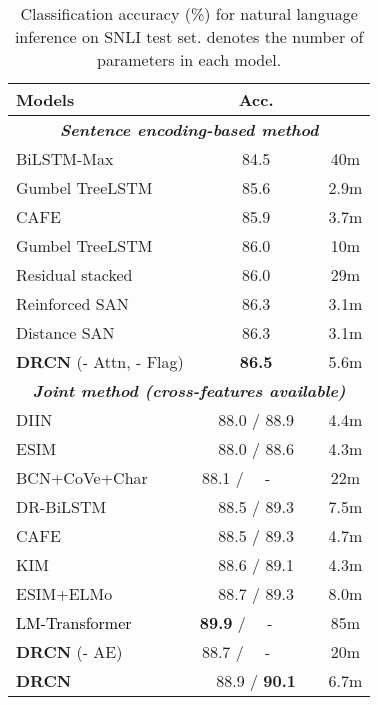 \documentclass[letterpaper]{article} \usepackage{aaai19}  \usepackage{times}  \usepackage{helvet}  \usepackage{courier}  \usepackage{url}  \usepackage{graphicx}  \frenchspacing  \setlength{\pdfpagewidth}{8.5in}  \setlength{\pdfpageheight}{11in}
\newcommand\shh[1]{\textcolor{black}{#1}}
\begin{document}
\begin{table}[t]
\centering
\resizebox{\linewidth}{!}
{
\begin{tabular}{lcc}\hline
   	\textbf{Models} & \textbf{Acc.} & \textbf{}  \\
	\hline
    \multicolumn{3}{c}{\textit{\textbf{Sentence encoding-based method}}} \\
	\hline
	BiLSTM-Max \cite{conneau2017supervised} & 84.5 & 40m   \\
Gumbel TreeLSTM \cite{choi2017learning} & 85.6 & 2.9m   \\
    CAFE \cite{tay2017compare} & 85.9 & 3.7m  \\
	Gumbel TreeLSTM \cite{choi2017learning} & 86.0 & 10m   \\
	Residual stacked \cite{nie2017shortcut} & 86.0 & 29m  \\ 
	Reinforced SAN \cite{shen2018reinforced} & 86.3 & 3.1m \\ 
	Distance SAN \cite{im2017distance} & 86.3 & 3.1m  \\          
	\textbf{DRCN} (- Attn, - Flag) & \textbf{86.5} & 5.6m  \\
	\hline
    \multicolumn{3}{c}{\textit{\textbf{Joint method (cross-features available)}}} \\
	\hline
    DIIN \cite{gong2018natural} & 88.0 / 88.9 & 4.4m \\
    ESIM \cite{chen2017enhanced} & 88.0 / 88.6 & 4.3m \\
    BCN+CoVe+Char \cite{mccann2017learned} & 88.1 / \ \ -\ \ \ \ \ & 22m \\
    DR-BiLSTM \cite{ghaeini2018dr} & 88.5 / 89.3 & 7.5m \\
    CAFE \cite{tay2017compare} & 88.5 / 89.3 & 4.7m \\
    KIM \cite{chen2017natural} & 88.6 / 89.1 & 4.3m  \\
    ESIM+ELMo \cite{Peters2018elmo} & 88.7 / 89.3 & 8.0m  \\
    \shh{LM-Transformer \cite{radford2018improving}} & \textbf{89.9} / \ \ -\ \ \ \ \ & 85m  \\
    \textbf{DRCN} (- AE) & 88.7 / \ \ -\ \ \ \ \ & 20m \\
    \textbf{DRCN} & 88.9 / \textbf{90.1} & 6.7m \\
	\hline
\end{tabular}
}
\caption{Classification accuracy (\%) for natural language inference on SNLI test set.  denotes the number of parameters in each model.}
\label{tab:exp_snli}
\end{table}
\end{document}
